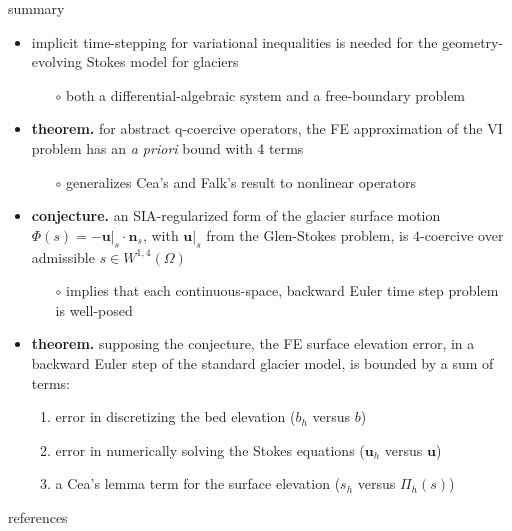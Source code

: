 \documentclass[10pt,svgnames]{beamer}
\newcommand{\bn}{\mathbf{n}}
\newcommand{\bu}{\mathbf{u}}
\newcommand{\qq}{\mathrm{q}}
\begin{document}
\begin{frame}{summary}
\begin{itemize}
\item implicit time-stepping for variational inequalities is needed for the geometry-evolving Stokes model for glaciers
    \begin{itemize}
    \item[$\circ$] both a differential-algebraic system and a free-boundary problem
    \end{itemize}
\item<2-4> \textbf{theorem.} for abstract $\qq$-coercive operators, the FE approximation of the VI problem has an \emph{a priori} bound with 4 terms
    \begin{itemize}
    \item[$\circ$] generalizes Cea's and Falk's result to nonlinear operators
    \end{itemize}
\item<3-4> \textbf{conjecture.} an SIA-regularized form of the glacier surface motion $\Phi(s) = -\bu|_s\cdot \bn_s$, with $\bu|_s$ from the Glen-Stokes problem, is $4$-coercive over admissible $s\in W^{1,4}(\Omega)$
    \begin{itemize}
    \item[$\circ$] implies that each continuous-space, backward Euler time step problem is well-posed
    \end{itemize}
\item<4> \textbf{theorem.} supposing the conjecture, the FE surface elevation error, in a backward Euler step of the standard glacier model, is bounded by a sum of terms:
    \begin{enumerate}
    \item error in discretizing the bed elevation ($b_h$ versus $b$)
    \item error in numerically solving the Stokes equations ($\bu_h$ versus $\bu$)
    \item a Cea's lemma term for the surface elevation ($s_h$ versus $\Pi_h(s)$) \strut
    \end{enumerate}
\end{itemize}
\end{frame}


\begin{frame}{references}

{\footnotesize }
\end{frame}
\end{document}
